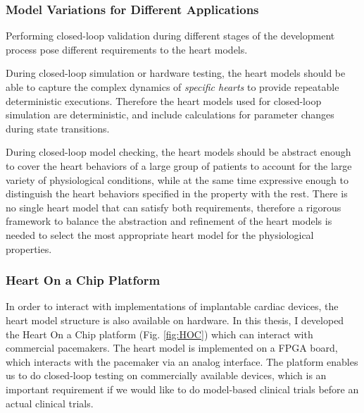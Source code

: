 \documentclass[a4paper]{article}
\begin{document}
\subsubsection{Model Variations for Different Applications}
Performing closed-loop validation during different stages of the development process pose different requirements to the heart models.

During closed-loop simulation or hardware testing, the heart models should be able to capture the complex dynamics of \emph{specific hearts} to provide repeatable deterministic executions.
Therefore the heart models used for closed-loop simulation are deterministic, and include calculations for parameter changes during state transitions.

During closed-loop model checking, the heart models should be abstract enough to cover the heart behaviors of a large group of patients to account for the large variety of physiological conditions, while at the same time expressive enough to distinguish the heart behaviors specified in the property with the rest.
There is no single heart model that can satisfy both requirements, therefore a rigorous framework to balance the abstraction and refinement of the heart models is needed to select the most appropriate heart model for the physiological properties.


\subsubsection{Heart On a Chip Platform}
In order to interact with implementations of implantable cardiac devices, the heart model structure is also available on hardware. 
In this thesis, I developed the Heart On a Chip platform (Fig. \ref{fig:HOC}) which can interact with commercial pacemakers.
The heart model is implemented on a FPGA board, which interacts with the pacemaker via an analog interface.
The platform enables us to do closed-loop testing on commercially available devices, which is an important requirement if we would like to do model-based clinical trials before an actual clinical trials.
\end{document}
